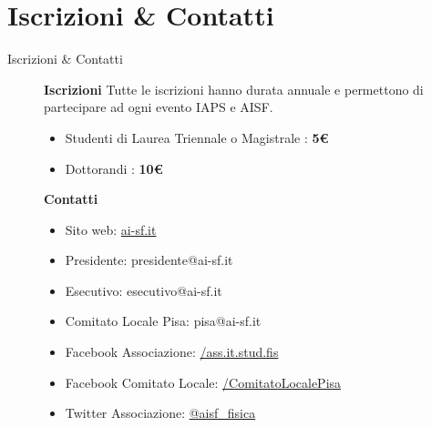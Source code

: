 \documentclass{Bredelebeamer}
\begin{document}
\section{Iscrizioni \& Contatti}
\begin{frame}{Iscrizioni \& Contatti}
\begin{figure}
\begin{block}{\centering \textbf{Iscrizioni}}
{\small Tutte le iscrizioni hanno durata annuale e permettono di partecipare ad ogni evento IAPS e AISF. }
\begin{itemize}
\item Studenti di Laurea Triennale o Magistrale : \textbf{5€}
\item Dottorandi : \textbf{10€}
\end{itemize}
\end{block}
\begin{block}{\centering \textbf{Contatti}}
\begin{itemize}
\item Sito web: \href{http://www.ai-sf.it/joomla/it/}{ai-sf.it}
\item Presidente: presidente@ai-sf.it
\item Esecutivo: esecutivo@ai-sf.it
\item Comitato Locale Pisa: pisa@ai-sf.it %
\item Facebook Associazione: \href{https://www.facebook.com/ass.it.stud.fis/?fref=ts}{/ass.it.stud.fis} %
\item Facebook Comitato Locale: \href{https://www.facebook.com/ComitatoLocalePisa/?fref=ts}{/ComitatoLocalePisa} %
\item Twitter Associazione: \href{https://twitter.com/aisf_fisica}{@aisf\_fisica}
\end{itemize}
\end{block}
\end{figure}
\end{frame}
\end{document}

